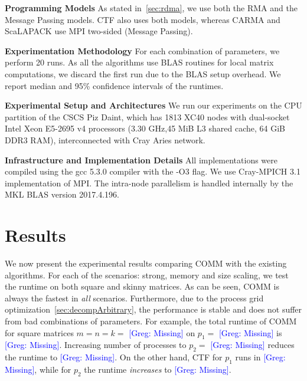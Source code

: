 \documentclass[sigplan,review,anonymous,10pt]{acmart}\settopmatter{printfolios=true,printccs=false,printacmref=false}
\newcommand\greg[1]{\textcolor{blue}{[Greg: #1]}}
\newcommand\mac[1]{\textcolor{red}{[Mac: #1]}}
\newcommand{\macb}[1]{\textbf{\textsf{#1}}}
\begin{document}
\macb{Programming Models}
%
As stated in~\cref{sec:rdma}, we use both the RMA and the Message Passing 
models. CTF also uses both models, whereas CARMA and ScaLAPACK use MPI 
two-sided (Message Passing).

\macb{Experimentation Methodology}
%
For each combination of parameters, we perform 20 runs. As all the algorithms 
use BLAS routines for local matrix computations, we discard the first run due 
to the BLAS setup overhead. We report median and 95\% confidence intervals of 
the runtimes.

\macb{Experimental Setup and Architectures}
%
We run our experiments on the CPU partition of the CSCS Piz Daint, which has 
1813 XC40 nodes with
dual-socket Intel Xeon E5-2695 v4 processors (3.30 GHz,45 MiB L3 shared cache, 
64 GiB DDR3 RAM),
interconnected with Cray Aries network.

\macb{Infrastructure and Implementation Details}
%
All implementations were compiled using the gcc 5.3.0 compiler with the -O3 
flag. We use 
Cray-MPICH 3.1 implementation of MPI. The intra-node parallelism is handled 
internally by the MKL BLAS version 2017.4.196. 

\section{Results}
\label{sec:results}
We now present the experimental results comparing COMM with the existing 
algorithms. For each of the scenarios: strong, memory and size scaling, we test 
the runtime on both square and skinny matrices. As can be seen, COMM is always 
the fastest in \emph{all} scenarios. 
Furthermore, due to the process grid optimization~\ref{sec:decompArbitrary}, 
the performance is stable and does not suffer from bad combinations of 
parameters. For example, the total runtime of COMM for square matrices $m=n=k=$ 
\greg{Missing} on $p_1=$ \greg{Missing} is \greg{Missing}. Increasing number of 
processes to $p_2=$ \greg{Missing} reduces the runtime to \greg{Missing}. On 
the other hand, CTF for $p_1$ runs in \greg{Missing}, while for $p_2$ the 
runtime \emph{increases} to \greg{Missing}.
\end{document}
